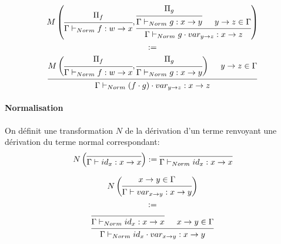 \documentclass[conference]{IEEEtran}
\begin{document}
\begin{equation}
\begin{gathered}
	M \left(
	\begin{prooftree}
		\hypo[]{\Pi_f}
		\infer1[]{\Gamma \vdash_{Norm} f : w \rightarrow x}
	\end{prooftree}
	,
	\begin{prooftree}
		\hypo[]{\Pi_g}
		\infer1[]{\Gamma \vdash_{Norm} g : x \rightarrow y}
		\hypo[]{y \rightarrow z \in \Gamma}
		\infer2[]{\Gamma \vdash_{Norm} g \cdot var_{y \rightarrow z} : x \rightarrow z}
	\end{prooftree}
	\right) \\
	:= \\
	\begin{prooftree}
		\hypo[]{
			M \left(
			\begin{prooftree}
				\hypo[]{\Pi_f}
				\infer1[]{\Gamma \vdash_{Norm} f : w \rightarrow x}
			\end{prooftree}
			,
			\begin{prooftree}
				\hypo[]{\Pi_g}
				\infer1[]{\Gamma \vdash_{Norm} g : x \rightarrow y}
			\end{prooftree}
			\right)
		}
		\hypo[]{y \rightarrow z \in \Gamma}
		\infer2[]{\Gamma \vdash_{Norm} (f \cdot g) \cdot var_{y \rightarrow z} : x \rightarrow z}
	\end{prooftree}
\end{gathered}
\end{equation}


\paragraph*{Normalisation} On définit une transformation $N$ de la dérivation d'un terme renvoyant une dérivation du terme normal correspondant:
\begin{equation}
	N \left(
	\begin{prooftree}
		\infer0[]{\Gamma \vdash id_x : x \rightarrow x}
	\end{prooftree}
	\right)
	:=
	\begin{prooftree}
		\infer0[]{\Gamma \vdash_{Norm} id_x : x \rightarrow x}
	\end{prooftree}
\end{equation}

\begin{equation}
\begin{gathered}
	N \left(
	\begin{prooftree}
		\hypo[]{x \rightarrow y \in \Gamma}
		\infer1[]{\Gamma \vdash var_{x \rightarrow y} : x \rightarrow y}
	\end{prooftree}
	\right) \\
	:= \\
	\begin{prooftree}
		\infer0[]{\Gamma \vdash_{Norm} id_x : x \rightarrow x}
		\hypo[]{x \rightarrow y \in \Gamma}
		\infer2[]{\Gamma \vdash_{Norm} id_x \cdot var_{x \rightarrow y} : x \rightarrow y}
	\end{prooftree}\\
\end{gathered}
\end{equation}
\end{document}
